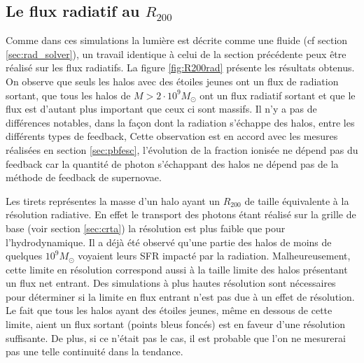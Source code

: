 
\subsection{Le flux radiatif au $R_{200}$}
\label{sec:radflow}

Comme dans ces simulations la lumière est décrite comme une fluide (cf section \autoref{sec:rad_solver}), un travail identique à celui de la section précédente peux être réalisé sur les flux radiatifs.
La figure \ref{fig:R200rad} présente les résultats obtenus.
On observe que seuls les halos avec des étoiles jeunes ont un flux de radiation sortant, que tous les halos de $M>2 \cdot 10^9 M_\odot$ ont un flux radiatif sortant et que le flux est d'autant plus important que ceux ci sont massifs.
Il n'y a pas de différences notables, dans la façon dont la radiation s'échappe des halos, entre les différents types de feedback, 
Cette observation est en accord avec les mesures réalisées en section \ref{sec:pbfesc}, l'évolution de la fraction ionisée ne dépend pas du feedback car la quantité de photon s'échappant des halos ne dépend pas de la méthode de feedback de supernovae.

Les tirets représentes la masse d'un halo ayant un $R_{200}$ de taille équivalente à la résolution radiative.
En effet le transport des photons étant réalisé sur la grille de base (voir section \ref{sec:crta}) la résolution est plus faible que pour l'hydrodynamique.
Il a déjà été observé qu'une partie des halos de moins de quelques $10^9 M_\odot$ voyaient leurs \ac{SFR} impacté par la radiation. %
Malheureusement, cette limite en résolution correspond aussi à la taille limite des halos présentant un flux net entrant.
Des simulations à plus hautes résolution sont nécessaires pour déterminer si la limite en flux entrant n'est pas due à un effet de résolution.
Le fait que tous les halos ayant des étoiles jeunes, même en dessous de cette limite, aient un flux sortant (points bleus foncés) est en faveur d'une résolution suffisante. 
De plus, si ce n'était pas le cas, il est probable que l'on ne mesurerai pas une telle continuité dans la tendance.

